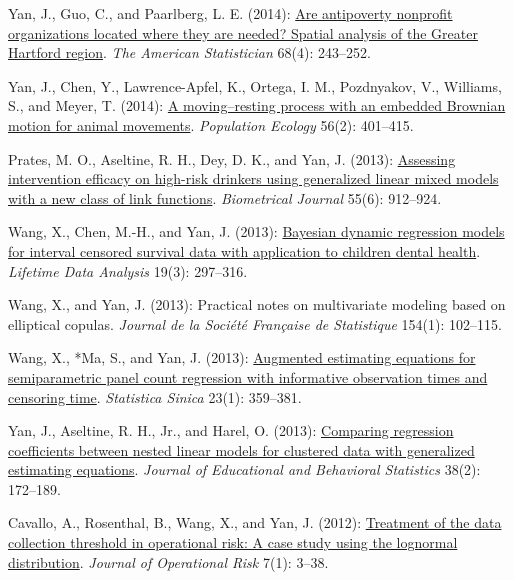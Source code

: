 \begin{RefereedJournalArticles}
\item Yan, J., Guo, C., and Paarlberg, L. E. (2014):
\href{https://doi.org/10.1080/00031305.2014.955211}{Are antipoverty
nonprofit organizations located where they are needed? Spatial analysis
of the Greater Hartford region}. \emph{The American Statistician} 68(4):
243--252.

\item Yan, J., Chen, Y., Lawrence-Apfel, K., Ortega, I. M., Pozdnyakov, V.,
Williams, S., and Meyer, T. (2014):
\href{https://doi.org/10.1007/s10144-013-0428-8}{A moving--resting
process with an embedded Brownian motion for animal movements}.
\emph{Population Ecology} 56(2): 401--415.

\item *Prates, M. O., Aseltine, R. H., Dey, D. K., and Yan, J.
(2013): \href{https://doi.org/10.1002/bimj.201300015}{Assessing
intervention efficacy on high-risk drinkers using generalized linear
mixed models with a new class of link functions}. \emph{Biometrical
Journal} 55(6): 912--924.

\item *Wang, X., Chen, M.-H., and Yan, J. (2013):
\href{https://doi.org/10.1007/s10985-013-9246-8}{Bayesian dynamic
regression models for interval censored survival data with application
to children dental health}. \emph{Lifetime Data Analysis} 19(3):
297--316.

\item *Wang, X., and Yan, J. (2013): Practical notes on
multivariate modeling based on elliptical copulas. \emph{Journal de la
Soci\'{e}t\'{e} Fran\c{c}aise de Statistique} 154(1): 102--115.

\item *Wang, X., *Ma, S., and Yan, J. (2013):
\href{https://doi.org/10.5705/ss.2010.297}{Augmented estimating
equations for semiparametric panel count regression with informative
observation times and censoring time}. \emph{Statistica Sinica} 23(1):
359--381.

\item Yan, J., Aseltine, R. H., Jr., and Harel, O. (2013):
\href{https://doi.org/10.3102/1076998611432175}{Comparing regression
coefficients between nested linear models for clustered data with
generalized estimating equations}. \emph{Journal of Educational and
Behavioral Statistics} 38(2): 172--189.

\item Cavallo, A., Rosenthal, B., Wang, X., and Yan, J. (2012):
\href{https://doi.org/10.21314/jop.2012.101}{Treatment of the data
collection threshold in operational risk: A case study using the
lognormal distribution}. \emph{Journal of Operational Risk} 7(1): 3--38.


\end{RefereedJournalArticles}
